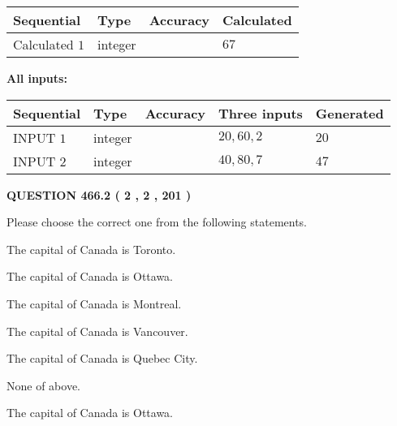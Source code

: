 \documentclass[12pt]{article}
\begin{document}
   
  
  
\noindent\begin{tabular}{|l|l|l|l|}
\hline
 Sequential & Type & Accuracy & Calculated \\ 
\hline
 
 
  Calculated $  1 $ & integer &  & 
  $ 67 $ 
 \\  \hline  
 \end{tabular}
   
   
   
   
\noindent\vspace{0.1in}\hspace{-0.08in} {\textbf{\Large{All inputs: }}}
   
   
  
  
\noindent\begin{tabular}{|l|l|l|l|l|}
\hline
 Sequential & Type & Accuracy & Three inputs & Generated \\ 
\hline
 
 
  INPUT $  1 $ & integer &  & $
 20
 , 
 60
 , 
 2
 $ & $ 20 $ 
 \\  \hline  
 
 
  INPUT $  2 $ & integer &  & $
 40
 , 
 80
 , 
 7
 $ & $ 47 $ 
 \\  \hline  
 \end{tabular}
   
   
  
\vspace{0.2in}
  
{\textbf{\Large{QUESTION
466.2 
 ( 2 , 2 , 201 )
}}}
  
  
Please choose the correct one from the following statements.
 
 
The capital of Canada is Toronto.
 
 
The capital of Canada is Ottawa.
 
 
The capital of Canada is Montreal.
 
 
The capital of Canada is Vancouver.
 
 
The capital of Canada is Quebec City.
 
 
 None of above.
 
 
\noindent{}
 
 
The capital of Canada is Ottawa.
 
\end{document}
